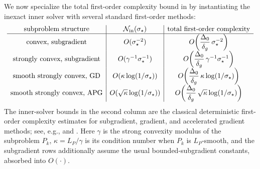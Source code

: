 \begin{remark}
\label{rem:dca-inexact-total-complexity}
We now specialize the total first-order complexity bound in
 by instantiating the inexact inner solver
with several standard first-order methods:
\[
\begin{array}{c|c|c}
\text{subproblem structure}
& \mathcal N_{\rm in}(\sigma_\star)
& \text{total first-order complexity}
\\ \hline
\text{convex, subgradient}
& O(\sigma_\star^{-2})
& O\!\left(\dfrac{\Delta_0}{\delta_g}\,\sigma_\star^{-2}\right)
\\
\text{strongly convex, subgradient}
& O(\gamma^{-1}\sigma_\star^{-1})
& O\!\left(\dfrac{\Delta_0}{\delta_g}\,\gamma^{-1}\sigma_\star^{-1}\right)
\\
\text{smooth strongly convex, GD}
& O(\kappa\log(1/\sigma_\star))
& O\!\left(\dfrac{\Delta_0}{\delta_g}\,\kappa\log(1/\sigma_\star)\right)
\\
\text{smooth strongly convex, APG}
& O(\sqrt{\kappa}\log(1/\sigma_\star))
& O\!\left(\dfrac{\Delta_0}{\delta_g}\,\sqrt{\kappa}\log(1/\sigma_\star)\right)
\end{array}
\]
The inner-solver bounds in the second column are the classical
deterministic first-order complexity estimates for subgradient, gradient,
and accelerated gradient methods; see, e.g.,
\citet[Chs.~3--4]{nesterov2018lectures} and
\citet[Chs.~3--5]{beck2017first}.
Here $\gamma$ is the strong convexity modulus of the subproblem $P_k$,
$\kappa=L_P/\gamma$ is its condition number when $P_k$ is $L_P$-smooth,
and the subgradient rows additionally assume the usual bounded-subgradient
constants, absorbed into $O(\cdot)$.


\end{remark}
